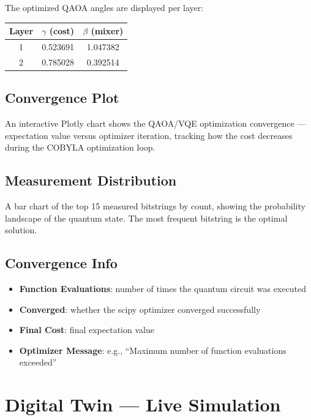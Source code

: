 \documentclass[11pt,a4paper]{article}
\begin{document}
The optimized QAOA angles are displayed per layer:

\begin{center}
\begin{tabular}{ccc}
  \toprule
  \textbf{Layer} & $\gamma$ \textbf{(cost)} & $\beta$ \textbf{(mixer)} \\
  \midrule
  1 & 0.523691 & 1.047382 \\
  2 & 0.785028 & 0.392514 \\
  \bottomrule
\end{tabular}
\end{center}

\subsection{Convergence Plot}

An interactive Plotly chart shows the QAOA/VQE optimization convergence — expectation value versus optimizer iteration, tracking how the cost decreases during the COBYLA optimization loop.

\subsection{Measurement Distribution}

A bar chart of the top 15 measured bitstrings by count, showing the probability landscape of the quantum state. The most frequent bitstring is the optimal solution.

\subsection{Convergence Info}

\begin{itemize}
  \item \textbf{Function Evaluations}: number of times the quantum circuit was executed
  \item \textbf{Converged}: whether the scipy optimizer converged successfully
  \item \textbf{Final Cost}: final expectation value
  \item \textbf{Optimizer Message}: e.g., ``Maximum number of function evaluations exceeded''
\end{itemize}


\section{Digital Twin — Live Simulation}
\end{document}
